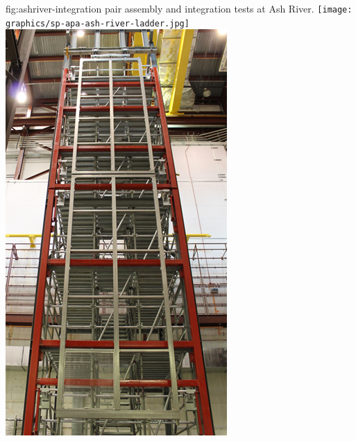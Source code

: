 \begin{dunefigure}{fig:ashriver-integration}
{ pair assembly and integration tests at Ash River.}
\texttt{[image: graphics/sp-apa-ash-river-ladder.jpg]} \quad
\includegraphics[height=0.5\textheight]{graphics/sp-apa-ash-river-doublet.png} 
\end{dunefigure}